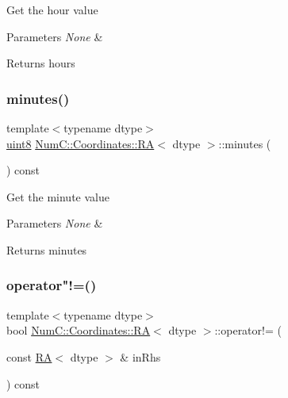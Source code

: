 Get the hour value


\begin{DoxyParams}{Parameters}
{\em None} & \\
\hline
\end{DoxyParams}
\begin{DoxyReturn}{Returns}
hours 
\end{DoxyReturn}
\mbox{\label{class_num_c_1_1_coordinates_1_1_r_a_a6e5fab3e72129828e77f4d19750398d4}} 
\subsubsection{\texorpdfstring{minutes()}{minutes()}}
{\footnotesize\ttfamily template$<$typename dtype$>$ \\
\mbox{\hyperlink{namespace_num_c_a60b2e2f49e1ff61059731c154e560869}{uint8}} \mbox{\hyperlink{class_num_c_1_1_coordinates_1_1_r_a}{Num\+C\+::\+Coordinates\+::\+RA}}$<$ dtype $>$\+::minutes (\begin{DoxyParamCaption}{ }\end{DoxyParamCaption}) const\hspace{0.3cm}{\ttfamily [inline]}}

Get the minute value


\begin{DoxyParams}{Parameters}
{\em None} & ~\newline
 \\
\hline
\end{DoxyParams}
\begin{DoxyReturn}{Returns}
minutes 
\end{DoxyReturn}
\mbox{\label{class_num_c_1_1_coordinates_1_1_r_a_ae0f38f418cc2ee6cf3f320cc85567d55}} 
\subsubsection{\texorpdfstring{operator"!=()}{operator!=()}}
{\footnotesize\ttfamily template$<$typename dtype$>$ \\
bool \mbox{\hyperlink{class_num_c_1_1_coordinates_1_1_r_a}{Num\+C\+::\+Coordinates\+::\+RA}}$<$ dtype $>$\+::operator!= (\begin{DoxyParamCaption}\item[{const \mbox{\hyperlink{class_num_c_1_1_coordinates_1_1_r_a}{RA}}$<$ dtype $>$ \&}]{in\+Rhs }\end{DoxyParamCaption}) const\hspace{0.3cm}{\ttfamily [inline]}}

